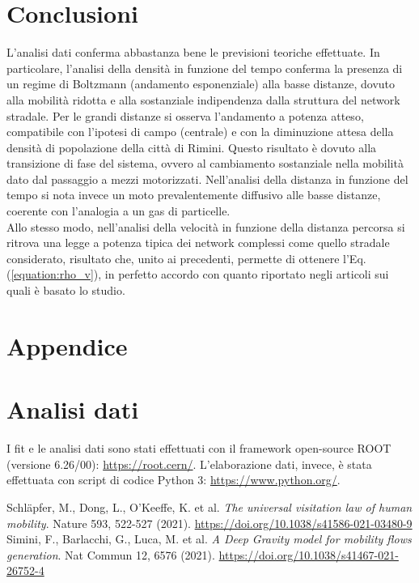 \documentclass[12pt,a4paper]{article}
\begin{document}
\section{Conclusioni}
L'analisi dati conferma abbastanza bene le previsioni teoriche effettuate.
In particolare, l'analisi della densità in funzione del tempo conferma la presenza di un regime di Boltzmann (andamento esponenziale) alla basse distanze, dovuto alla mobilità ridotta e alla sostanziale indipendenza dalla struttura del network stradale.
Per le grandi distanze si osserva l'andamento a potenza atteso, compatibile con l'ipotesi di campo (centrale) e con la diminuzione attesa della densità di popolazione della città di Rimini.
Questo risultato è dovuto alla transizione di fase del sistema, ovvero al cambiamento sostanziale nella mobilità dato dal passaggio a mezzi motorizzati.
Nell'analisi della distanza in funzione del tempo si nota invece un moto prevalentemente diffusivo alle basse distanze, coerente con l'analogia a un gas di particelle.\\
Allo stesso modo, nell'analisi della velocità in funzione della distanza percorsa si ritrova una legge a potenza tipica dei network complessi come quello stradale considerato, risultato che, unito ai precedenti, permette di ottenere l'Eq. (\ref{equation:rho_v}), in perfetto accordo con quanto riportato negli articoli sui quali è basato lo studio.
\newpage
\section*{Appendice}
\appendix
\renewcommand{\thesubsection}{\Roman{subsection}}
\section{Analisi dati}
\label{appendix:analisi}
I fit e le analisi dati sono stati effettuati con il framework open-source ROOT (versione 6.26/00): \url{https://root.cern/}.
L'elaborazione dati, invece, è stata effettuata con script di codice Python 3: \url{https://www.python.org/}.
\begin{thebibliography}{2}
 Schläpfer, M., Dong, L., O'Keeffe, K. et al. \emph{The universal visitation law of human mobility}. Nature 593, 522-527 (2021). \url{https://doi.org/10.1038/s41586-021-03480-9}
 Simini, F., Barlacchi, G., Luca, M. et al. \emph{A Deep Gravity model for mobility flows generation}. Nat Commun 12, 6576 (2021). \url{https://doi.org/10.1038/s41467-021-26752-4}
\end{thebibliography}
\end{document}
